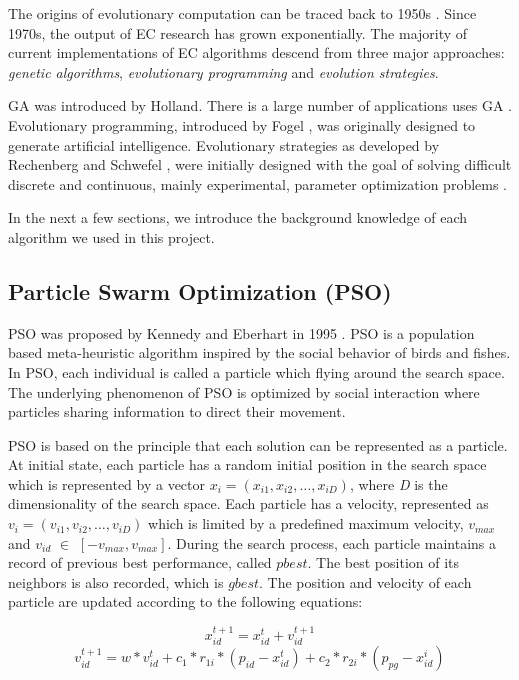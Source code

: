The origins of evolutionary computation can be traced back to 1950s \cite{back1997evolutionary}. Since 1970s, the output of EC research has grown exponentially. 
The majority of current implementations of EC algorithms descend from three major approaches: \emph{genetic algorithms}, \emph{evolutionary programming}
and \emph{evolution strategies}.

GA \cite{holland1962outline} was introduced by Holland. There is a large number of applications uses GA \cite{de1992genetic, de1993genetic}.
Evolutionary programming, introduced by Fogel \cite{fogel1962autonmous}, was originally designed to generate artificial intelligence. 
Evolutionary strategies as developed by Rechenberg \cite{rechenberg1971} and Schwefel \cite{Schwefel1975}, were initially designed with the goal of solving difficult discrete
and continuous, mainly experimental, parameter optimization problems \cite{klock}. 

In the next a few sections, we introduce the background knowledge of each
algorithm we used in this project.


\subsection{Particle Swarm Optimization (PSO)}
PSO was proposed by Kennedy and Eberhart in 1995 \cite{488968}. PSO is a population based meta-heuristic algorithm 
inspired by the social behavior of birds and fishes. In PSO, each individual is called a particle which flying
around the search space. The underlying phenomenon of PSO is optimized by social interaction 
where particles sharing information to direct their movement.


PSO is based on the principle that each solution can be represented as a 
particle. At initial state, each particle has a random initial position in the 
search space which is represented by a vector $x_i = (x_{i1}, x_{i2}, \dots, x_{iD})$, where \emph{D} is the dimensionality of the search space.
Each particle has a velocity, represented as $v_i = (v_{i1}, v_{i2}, \dots, v_{iD})$ which is limited by a 
predefined maximum velocity, $v_{max}$ and  $v_{id}$ $\in$ $[-v_{max}, v_{max}]$. 
During the search process, each particle maintains a record of previous best performance, called $pbest$. The best position of its neighbors 
is also recorded, which is $gbest$. The position and velocity of each particle are 
updated according to the following equations:

\begin{equation}
	x^{t+1}_{id} = x^{t}_{id} + v^{t+1}_{id}
\end{equation}
\begin{equation}
	v^{t+1}_{id} = w * v^{t}_{id} + c_1 * r_{1i} * (p_{id} - x^t_{id}) + c_2 * r_{2i} * (p_{pg} - x^i_{id})
\end{equation}

